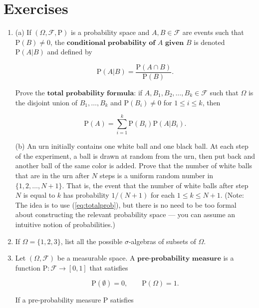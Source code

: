 \documentclass[11pt]{report}
\providecommand{\cal}{\mathcal}
\theoremstyle{plain}
\theoremstyle{definition}
\begin{document}
\chapter*{Exercises}

\begin{enumerate}[label=\arabic*.]
\item (a) If $(\Omega, {\cal F}, \mathrm{P})$ is a probability space and $A, B\in {\cal F}$ are events such that $\mathrm{P}(B)\neq 0$, the $\textbf{conditional probability of } A \textbf{ given } B$ is denoted $\mathrm{P}(A | B)$ and defined by

\[
\mathrm{P}(A | B) = \frac{\mathrm{P}(A \cap B)}{\mathrm{P}(B)}.
\]

Prove the $\textbf{total probability formula:}$ if $A,B_1,B_2,\ldots,B_k \in {\cal F}$ such that $\Omega$ is the disjoint union of $B_1,\ldots, B_k$ and $\mathrm{P}(B_i) \neq 0$ for $1\le i\le k$, then

\begin{equation*}
\tag{31}\label{eq:totalprob}
\mathrm{P}(A) = \sum_{i=1}^k \mathrm{P}(B_i) \mathrm{P}(A | B_i).
\end{equation*}

(b) An urn initially contains one white ball and one black ball. At each step of the experiment, a ball is drawn at random from the urn, then put back and another ball of the same color is added. Prove that the number of white balls that are in the urn after $N$ steps is a uniform random number in $\{1,2,\ldots,N+1\}$. That is, the event that the number of white balls after step $N$ is equal to $k$ has probability $1/(N+1)$ for each $1\le k\le N+1$.
(Note: The idea is to use (\ref{eq:totalprob}), but there is no need to be too formal about constructing the relevant probability space --- you can assume an intuitive notion of probabilities.)
\item If $\Omega=\{1,2,3\}$, list all the possible $\sigma$-algebras of subsets of $\Omega$.
\item Let $(\Omega, {\cal F})$ be a measurable space. A $\textbf{pre-probability measure}$ is a function $\mathrm{P}:{\cal F}\to [0,1]$ that satisfies

\begin{equation*}
\tag{32}\label{eq:P1}
\mathrm{P}(\emptyset) = 0, \qquad \mathrm{P}(\Omega) = 1.
\end{equation*}

If a pre-probability measure $\mathrm{P}$ satisfies


\end{enumerate}
\end{document}
